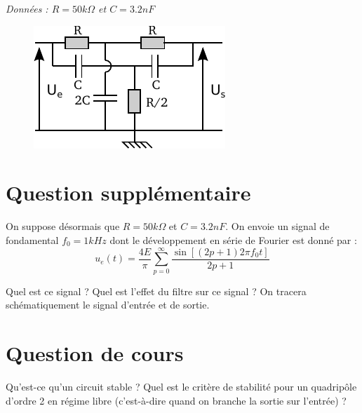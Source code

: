\documentclass{report}
\begin{document}
\textit{Données : $R=50k\Omega$ et $C=3.2nF$}
\begin{figure}[!h]
\centering
\includegraphics[width=0.5\linewidth]{circuit_2.pdf}
\end{figure}
\section*{Question supplémentaire}
On suppose désormais que $R=50k\Omega$ et $C=3.2nF$. On envoie un signal de fondamental $f_{0}=1kHz$ dont le développement en série de Fourier est donné par :
\begin{equation}
u_{e}(t)=\frac{4E}{\pi}\sum_{p=0}^{\infty}\frac{\sin \left[    \left( 2p+1\right)2\pi f_{0}t \right]}{2p+1}  
\end{equation}

Quel est ce signal ? Quel est l'effet du filtre sur ce signal ? On tracera schématiquement le signal d'entrée et de sortie.

\newpage
\section*{Question de cours}
Qu'est-ce qu'un circuit stable ? Quel est le critère de stabilité pour un quadripôle d'ordre 2 en régime libre (c'est-à-dire quand on branche la sortie sur l'entrée) ?
\end{document}
